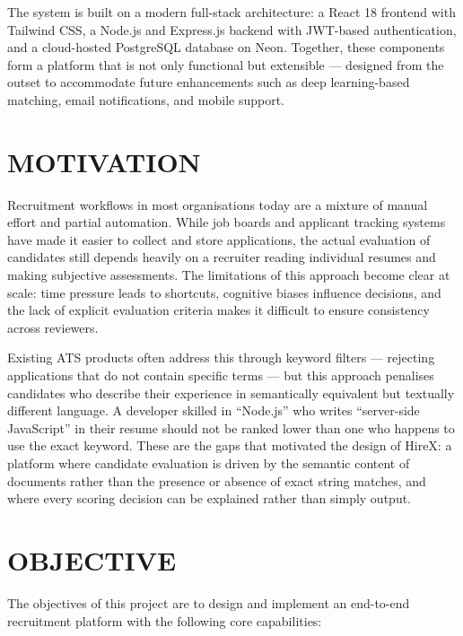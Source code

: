 \documentclass[12pt,a4paper]{report}
\begin{document}
The system is built on a modern full-stack architecture: a React 18 frontend with Tailwind CSS, a Node.js and Express.js backend with JWT-based authentication, and a cloud-hosted PostgreSQL database on Neon. Together, these components form a platform that is not only functional but extensible — designed from the outset to accommodate future enhancements such as deep learning-based matching, email notifications, and mobile support.

\section{MOTIVATION}

Recruitment workflows in most organisations today are a mixture of manual effort and partial automation. While job boards and applicant tracking systems have made it easier to collect and store applications, the actual evaluation of candidates still depends heavily on a recruiter reading individual resumes and making subjective assessments. The limitations of this approach become clear at scale: time pressure leads to shortcuts, cognitive biases influence decisions, and the lack of explicit evaluation criteria makes it difficult to ensure consistency across reviewers.

Existing ATS products often address this through keyword filters — rejecting applications that do not contain specific terms — but this approach penalises candidates who describe their experience in semantically equivalent but textually different language. A developer skilled in ``Node.js'' who writes ``server-side JavaScript'' in their resume should not be ranked lower than one who happens to use the exact keyword. These are the gaps that motivated the design of HireX: a platform where candidate evaluation is driven by the semantic content of documents rather than the presence or absence of exact string matches, and where every scoring decision can be explained rather than simply output.

\section{OBJECTIVE}

The objectives of this project are to design and implement an end-to-end recruitment platform with the following core capabilities:
\end{document}
